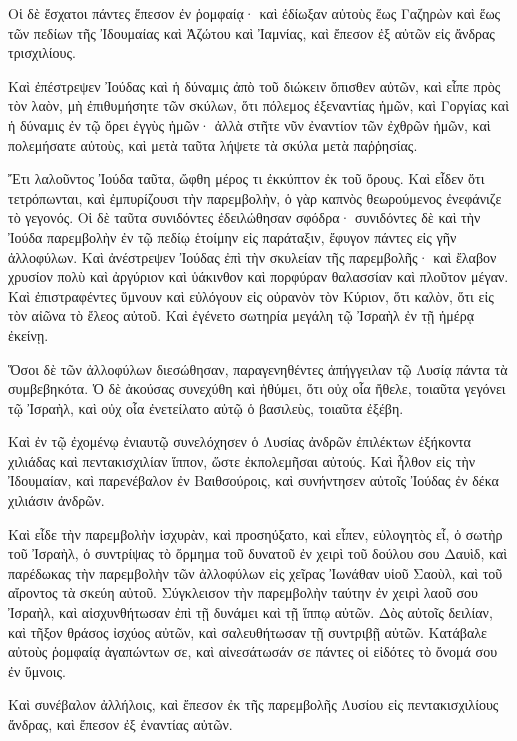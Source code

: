 {Οἱ δὲ ἔσχατοι πάντες ἔπεσον ἐν ῥομφαίᾳ· καὶ ἐδίωξαν αὐτοὺς ἕως Γαζηρὼν καὶ ἕως τῶν πεδίων τῆς Ἰδουμαίας καὶ Ἀζώτου καὶ Ἰαμνίας, καὶ ἔπεσον ἐξ αὐτῶν εἰς ἄνδρας τρισχιλίους.
\par }{\PP {}Καὶ ἐπέστρεψεν Ἰούδας καὶ ἡ δύναμις ἀπὸ τοῦ διώκειν ὄπισθεν αὐτῶν,
καὶ εἶπε πρὸς τὸν λαὸν, μὴ ἐπιθυμήσητε τῶν σκύλων, ὅτι πόλεμος ἐξεναντίας ἡμῶν,
καὶ Γοργίας καὶ ἡ δύναμις ἐν τῷ ὄρει ἐγγὺς ἡμῶν· ἀλλὰ στῆτε νῦν ἐναντίον τῶν ἐχθρῶν ἡμῶν, καὶ πολεμήσατε αὐτοὺς, καὶ μετὰ ταῦτα λήψετε τὰ σκύλα μετὰ παῤῥησίας.
\par }{\PP {}Ἔτι λαλοῦντος Ἰούδα ταῦτα, ὤφθη μέρος τι ἐκκύπτον ἐκ τοῦ ὄρους.
Καὶ εἶδεν ὅτι τετρόπωνται, καὶ ἐμπυρίζουσι τὴν παρεμβολὴν, ὁ γὰρ καπνὸς θεωρούμενος ἐνεφάνιζε τὸ γεγονός.
Οἱ δὲ ταῦτα συνιδόντες ἐδειλώθησαν σφόδρα· συνιδόντες δὲ καὶ τὴν Ἰούδα παρεμβολὴν ἐν τῷ πεδίῳ ἑτοίμην εἰς παράταξιν,
ἔφυγον πάντες εἰς γῆν ἀλλοφύλων.
Καὶ ἀνέστρεψεν Ἰούδας ἐπὶ τὴν σκυλείαν τῆς παρεμβολῆς· καὶ ἔλαβον χρυσίον πολὺ καὶ ἀργύριον καὶ ὑάκινθον καὶ πορφύραν θαλασσίαν καὶ πλοῦτον μέγαν.
Καὶ ἐπιστραφέντες ὕμνουν καὶ εὐλόγουν εἰς οὐρανὸν τὸν Κύριον, ὅτι καλὸν, ὅτι εἰς τὸν αἰῶνα τὸ ἔλεος αὐτοῦ.
Καὶ ἐγένετο σωτηρία μεγάλη τῷ Ἰσραὴλ ἐν τῇ ἡμέρᾳ ἐκείνῃ.
\par }{\PP {}Ὅσοι δὲ τῶν ἀλλοφύλων διεσώθησαν, παραγενηθέντες ἀπήγγειλαν τῷ Λυσίᾳ πάντα τὰ συμβεβηκότα.
Ὁ δὲ ἀκούσας συνεχύθη καὶ ἠθύμει, ὅτι οὐχ οἷα ἤθελε, τοιαῦτα γεγόνει τῷ Ἰσραὴλ, καὶ οὐχ οἷα ἐνετείλατο αὐτῷ ὁ βασιλεὺς, τοιαῦτα ἐξέβη.
\par }{\PP {}Καὶ ἐν τῷ ἐχομένῳ ἐνιαυτῷ συνελόχησεν ὁ Λυσίας ἀνδρῶν ἐπιλέκτων ἑξήκοντα χιλιάδας καὶ πεντακισχιλίαν ἵππον, ὥστε ἐκπολεμῆσαι αὐτούς.
Καὶ ἦλθον εἰς τὴν Ἰδουμαίαν, καὶ παρενέβαλον ἐν Βαιθσούροις, καὶ συνήντησεν αὐτοῖς Ἰούδας ἐν δέκα χιλιάσιν ἀνδρῶν.
\par }{\PP {}Καὶ εἶδε τὴν παρεμβολὴν ἰσχυρὰν, καὶ προσηύξατο, καὶ εἶπεν, εὐλογητὸς εἶ, ὁ σωτὴρ τοῦ Ἰσραὴλ, ὁ συντρίψας τὸ ὅρμημα τοῦ δυνατοῦ ἐν χειρὶ τοῦ δούλου σου Δαυὶδ, καὶ παρέδωκας τὴν παρεμβολὴν τῶν ἀλλοφύλων εἰς χεῖρας Ἰωνάθαν υἱοῦ Σαοὺλ, καὶ τοῦ αἴροντος τὰ σκεύη αὐτοῦ.
Σύγκλεισον τὴν παρεμβολὴν ταύτην ἐν χειρὶ λαοῦ σου Ἰσραὴλ, καὶ αἰσχυνθήτωσαν ἐπὶ τῇ δυνάμει καὶ τῇ ἵππῳ αὐτῶν.
Δὸς αὐτοῖς δειλίαν, καὶ τῆξον θράσος ἰσχύος αὐτῶν, καὶ σαλευθήτωσαν τῇ συντριβῇ αὐτῶν.
Κατάβαλε αὐτοὺς ῥομφαίᾳ ἀγαπώντων σε, καὶ αἰνεσάτωσάν σε πάντες οἱ εἰδότες τὸ ὄνομά σου ἐν ὕμνοις.
\par }{\PP {}Καὶ συνέβαλον ἀλλήλοις, καὶ ἔπεσον ἐκ τῆς παρεμβολῆς Λυσίου εἰς πεντακισχιλίους ἄνδρας, καὶ ἔπεσον ἐξ ἐναντίας αὐτῶν.
}
